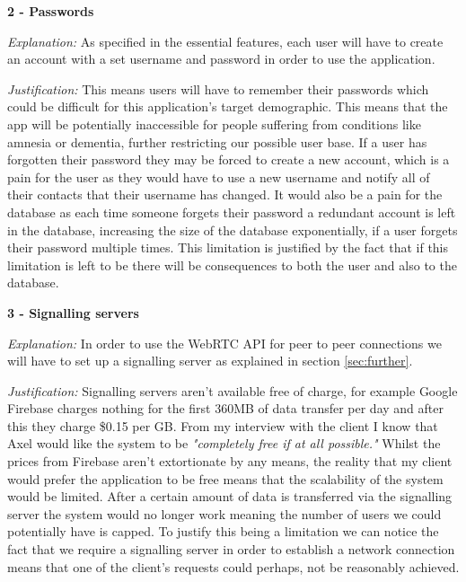 \textsf{\bfseries 2 - Passwords} \\ \vspace{0.1cm}

\textit{Explanation:}
As specified in the essential features, each user will have to
create an account with a set username and password in order to
use the application. \vspace{0.1cm}

\textit{Justification:} This means users will have to remember
their passwords which could be difficult for this application's
target demographic. This means that the app will be
potentially inaccessible for people suffering from conditions
like amnesia or dementia, further restricting our possible
user base. If a user has forgotten their password they
may be forced to create a new account, which is a pain for the
user as they would have to use a new username and notify all of
their contacts that their username has changed. It would also
be a pain for the database as each time someone forgets their
password a redundant account is left in the database,
increasing the size of the database exponentially, if a user
forgets their password multiple times. This limitation is
justified by the fact that if this limitation is left to be
there will be consequences to both the user and also to the
database. \\ \vspace{0.2cm}

\textsf{\bfseries 3 - Signalling servers} \\ \vspace{0.1cm}

\textit{Explanation:}
In order to use the WebRTC API for peer to peer connections we
will have to set up a signalling server as explained in
section \ref{sec:further}. \vspace{0.1cm}

\textit{Justification:}
Signalling servers aren't
available free of charge, for example Google Firebase charges
nothing for the
first 360MB of data transfer per day and after this they charge
\$0.15 per GB. From my interview with the client I know that
Axel would like the system to be \textit{"completely free if
at all possible."} Whilst the prices from Firebase aren't
extortionate by any means, the reality that my client would
prefer the application to be free means that the scalability of
the system would be limited. After a certain amount of data is
transferred via the signalling server the system would no longer
work meaning the number of users we could potentially have is
capped. To justify this being a limitation we can notice
the fact that we require a signalling server in order to
establish a network connection means that one of the client's
requests could perhaps, not be reasonably achieved. \\
\vspace{0.2cm}

